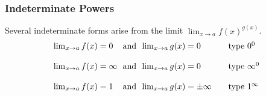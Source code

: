 \begin{frame}
\frametitle{Indeterminate Powers}
Several indeterminate forms arise from the limit $\lim_{x\rightarrow a} f(x)^{g(x)}$.
\[
\begin{array}{l@{\ \ }c@{\ \ }l@{\qquad}l}
\lim_{x\rightarrow a} f(x) = 0 & \textrm{and} & \lim_{x\rightarrow a}g(x) = 0 & \textrm{type } 0^0 \\
& & & \\
\lim_{x\rightarrow a} f(x) = \infty & \textrm{and} & \lim_{x\rightarrow a}g(x) = 0 & \textrm{type } \infty^0 \\
& & & \\
\lim_{x\rightarrow a} f(x) = 1 & \textrm{and} & \lim_{x\rightarrow a}g(x) = \pm \infty & \textrm{type } 1^{\infty} 
\end{array}
\]
\end{frame}
